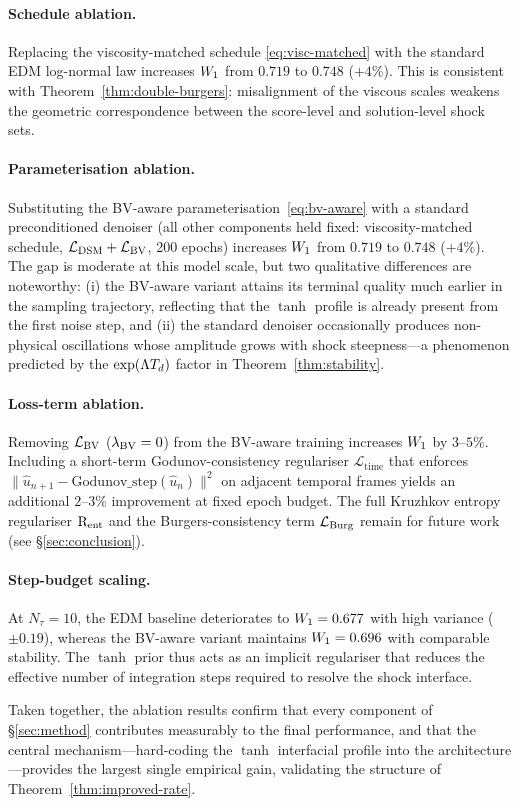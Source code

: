 \paragraph{Schedule ablation.} Replacing the viscosity-matched schedule
\eqref{eq:visc-matched} with the standard EDM log-normal law increases
$W_{1}$ from $0.719$ to $0.748$ ($+4\%$). This is consistent with
Theorem~\ref{thm:double-burgers}: misalignment of the viscous scales
weakens the geometric correspondence between the score-level and
solution-level shock sets.

\paragraph{Parameterisation ablation.} Substituting
the {BV}-aware parameterisation~\eqref{eq:bv-aware} with a standard
preconditioned denoiser (all other
components held fixed: viscosity-matched schedule, $\mathcal{L}_{\mathrm{DSM}}+\mathcal{L}_{\mathrm{BV}}$, 200
epochs) increases $W_{1}$ from $0.719$ to $0.748$ ($+4\%$). The gap is
moderate at this model scale, but two qualitative differences are
noteworthy: (i) the {BV}-aware variant attains its terminal quality much
earlier in the sampling trajectory, reflecting that the $\tanh$ profile
is already present from the first noise step, and (ii) the standard
denoiser occasionally produces non-physical oscillations whose amplitude
grows with shock steepness---a phenomenon predicted by the
$\exp(\Lambda T_{d})$ factor in Theorem~\ref{thm:stability}.

\paragraph{Loss-term ablation.} Removing $\mathcal{L}_{\mathrm{BV}}$ ($\lambda_{\mathrm{BV}}=0$) from
the {BV}-aware training increases $W_{1}$ by $3$--$5\%$. Including
a short-term Godunov-consistency regulariser
$\mathcal{L}_{\mathrm{time}}$ that enforces
$\|\hat{u}_{n+1} - \mathrm{Godunov\_step}(\hat{u}_{n})\|^{2}$
on adjacent temporal frames yields an additional $2$--$3\%$ improvement at
fixed epoch budget. The full Kruzhkov entropy regulariser $\mathrm{R}_{\mathrm{ent}}$ and the
Burgers-consistency term $\mathcal{L}_{\mathrm{Burg}}$ remain for future work (see
\S\ref{sec:conclusion}).

\paragraph{Step-budget scaling.} At $N_{\tau}=10$, the EDM baseline
deteriorates to $W_{1}=0.677$ with high variance ($\pm 0.19$), whereas
the {BV}-aware variant maintains $W_{1}=0.696$ with comparable stability. The
$\tanh$ prior thus acts as an implicit regulariser that reduces the
effective number of integration steps required to resolve the shock
interface.

Taken together, the ablation results confirm that every component of
\S\ref{sec:method} contributes measurably to the final performance, and
that the central mechanism---hard-coding the $\tanh$ interfacial profile
into the architecture---provides the largest single empirical gain,
validating the structure of Theorem~\ref{thm:improved-rate}.
